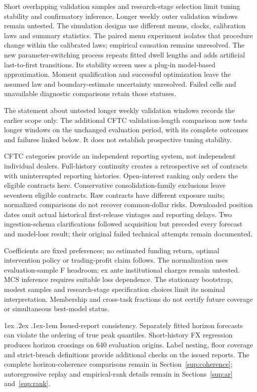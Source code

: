\documentclass[10pt,a4paper]{article}
\makeatletter
\renewcommand\paragraph{\@startsection{paragraph}{4}{\z@}%
  {1ex \@plus .2ex \@minus .1ex}{-1em}%
  {\normalfont\normalsize\bfseries}}
\makeatother
\begin{document}
Short overlapping validation samples and research-stage selection limit tuning stability and confirmatory inference. Longer weekly outer validation windows remain untested. The simulation designs use different menus, clocks, calibration laws and summary statistics. The paired menu experiment isolates that procedure change within the calibrated laws; empirical causation remains unresolved. The new parameter-switching process repeats fitted dwell lengths and adds artificial last-to-first transitions. Its stability screen uses a plug-in model-based approximation. Moment qualification and successful optimization leave the assumed law and boundary-estimate uncertainty unresolved. Failed cells and unavailable diagnostic comparisons retain those statuses.

The statement about untested longer weekly validation windows records the earlier scope only. The additional CFTC validation-length comparison now tests longer windows on the unchanged evaluation period, with its complete outcomes and failures linked below. It does not establish prospective tuning stability.

CFTC categories provide an independent reporting system, not independent individual dealers. Full-history continuity creates a retrospective set of contracts with uninterrupted reporting histories. Open-interest ranking only orders the eligible contracts here. Conservative consolidation-family exclusions leave seventeen eligible contracts. Raw contracts have different exposure units; normalized comparisons do not recover common-dollar risks. Downloaded position dates omit actual historical first-release vintages and reporting delays. Two ingestion-schema clarifications followed acquisition but preceded every forecast and model-loss result; their original failed technical attempts remain documented.

Coefficients are fixed preferences; no estimated funding return, optimal intervention policy or trading-profit claim follows. The normalization uses evaluation-sample F headroom; ex ante institutional charges remain untested. MCS inference requires suitable loss dependence. The stationary bootstrap, modest samples and research-stage specification choices limit its nominal interpretation. Membership and cross-task fractions do not certify future coverage or simultaneous best-model status.

\paragraph{Issued-report consistency.}
Separately fitted horizon forecasts can violate the ordering of true peak quantiles. Short-history FX regression produces horizon crossings on 640 evaluation origins. Label nesting, floor coverage and strict-breach definitions provide additional checks on the issued reports.
The complete horizon-coherence comparisons remain in Section~\ref{sup:coherence}; autoregressive replay and empirical-rank details remain in Sections~\ref{sup:ar} and~\ref{sup:rank}.
\end{document}
